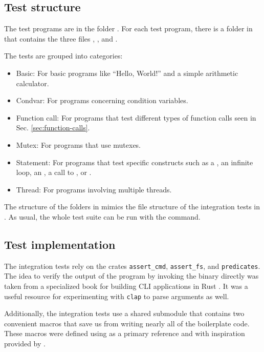 \subsection{Test structure}

The test programs are in the folder .
For each test program, there is a folder in 
that contains the three files
, , and .

The tests are grouped into categories:

\begin{itemize}
  \item Basic: For basic programs like ``Hello, World!'' and a simple arithmetic calculator.
  \item Condvar: For programs concerning condition variables.
  \item Function call: For programs that test different types
        of function calls seen in Sec. \ref{sec:function-calls}.
  \item Mutex: For programs that use mutexes.
  \item Statement: For programs that test specific constructs such as a ,
        an infinite loop, an , a call to ,
        or .
  \item Thread: For programs involving multiple threads.
\end{itemize}

The structure of the folders in  mimics the file structure
of the integration tests in .
As usual, the whole test suite can be run with the  command.

\subsection{Test implementation}

The integration tests rely on the crates \texttt{assert\_cmd}, \texttt{assert\_fs},
and \texttt{predicates}.
The idea to verify the output of the program by invoking the binary directly was
taken from a specialized book for building \acrshort{CLI} applications in Rust \cite[Chap. 1.6]{rust-cli-book}.
It was a useful resource for experimenting with \texttt{clap} to parse arguments as well.

Additionally, the integration tests use a shared submodule \cite[Chap. 11.3]{rust-book}
that contains two convenient macros that save us from writing nearly all of the boilerplate code.
These macros were defined using \cite{rust-macros} as a primary reference
and with inspiration provided by \cite{oaten2023}.

